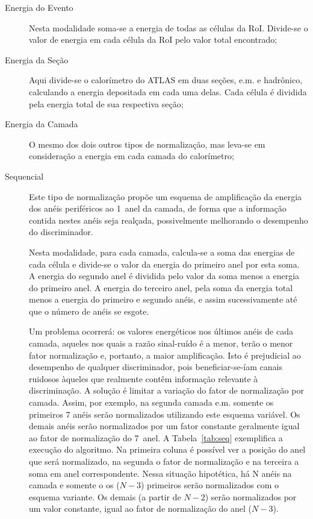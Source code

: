 \begin{description}
\item[Energia do Evento] Nesta modalidade soma-se a energia de todas as células
da RoI. Divide-se o valor de energia em cada célula da RoI pelo valor total
encontrado;

\item[Energia da Seção] Aqui divide-se o calorímetro do ATLAS em duas seções,
e.m.  e hadrônico, calculando a energia depositada em cada uma delas. Cada
célula é dividida pela energia total de sua respectiva seção;

\item[Energia da Camada] O mesmo dos dois outros tipos de normalização, mas
leva-se em consideração a energia em cada camada do calorímetro;

\item[Sequencial] Este tipo de normalização propõe um esquema de amplificação
da energia dos anéis periféricos ao 1\eiro\ anel da camada, de forma que a
informação contida nestes anéis seja realçada, possivelmente melhorando o
desempenho do discriminador.

Nesta modalidade, para cada camada, calcula-se a soma das energias de cada
célula e divide-se o valor da energia do primeiro anel por esta soma. A energia
do segundo anel é dividida pelo valor da soma menos a energia do primeiro
anel. A energia do terceiro anel, pela soma da energia total menos a energia do
primeiro e segundo anéis, e assim sucessivamente até que o número de anéis se
esgote.

Um problema ocorrerá: os valores energéticos nos últimos anéis de cada camada,
aqueles nos quais a razão sinal-ruído é a menor, terão o menor fator
normalização e, portanto, a maior amplificação. Isto é prejudicial ao
desempenho de qualquer discriminador, pois beneficiar-se-íam canais ruidosos
àqueles que realmente contêm informação relevante à discriminação. A solução é
limitar a variação do fator de normalização por camada. Assim, por exemplo, na
segunda camada e.m. somente os primeiros 7 anéis serão normalizados utilizando
este esquema variável. Os demais anéis serão normalizados por um fator
constante geralmente igual ao fator de normalização do 7\eiro\ anel. A
Tabela~\ref{tab:seq} exemplifica a execução do algoritmo. Na primeira coluna é
possível ver a posição do anel que será normalizado, na segunda o fator de
normalização e na terceira a soma em anel correspondente. Nessa situação
hipotética, há N anéis na camada e somente o os ($N-3$) primeiros serão
normalizados com o esquema variante. Os demais (a partir de $N-2$) serão
normalizados por um valor constante, igual ao fator de normalização do anel
($N-3$).


\end{description}
